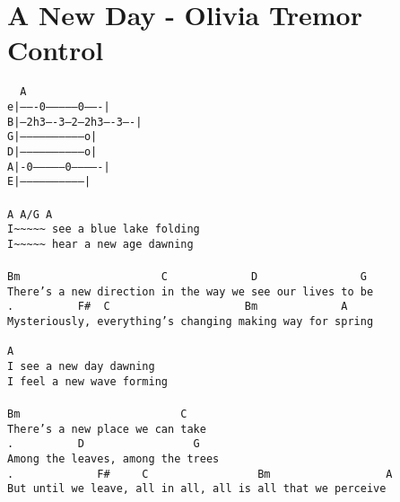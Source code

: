 \newpage
\section{A New Day - Olivia Tremor Control}
\label{A New Day - Olivia Tremor Control}
\texttt{\ \ A\\
e|-------0--------------0-------|\\
B|---2h3----3---2---2h3----3----|\\
G|-----------------------------o|\\
D|-----------------------------o|\\
A|-0--------------0-------------|\\
E|------------------------------|\\
\\
A\ A/G\ A\\
I\textasciitilde\textasciitilde\textasciitilde\textasciitilde\textasciitilde\ see\ a\ blue\ lake\ folding\\
I\textasciitilde\textasciitilde\textasciitilde\textasciitilde\textasciitilde\ hear\ a\ new\ age\ dawning\\
\\
Bm\ \ \ \ \ \ \ \ \ \ \ \ \ \ \ \ \ \ \ \ \ \ C\ \ \ \ \ \ \ \ \ \ \ \ \ D\ \ \ \ \ \ \ \ \ \ \ \ \ \ \ \ G\\
There's\ a\ new\ direction\ in\ the\ way\ we\ see\ our\ lives\ to\ be\\
.\ \ \ \ \ \ \ \ \ \ F\#\ \ C\ \ \ \ \ \ \ \ \ \ \ \ \ \ \ \ \ \ \ \ \ Bm\ \ \ \ \ \ \ \ \ \ \ \ \ A\\
Mysteriously,\ everything's\ changing\ making\ way\ for\ spring\\
\ \ \ \\
A\\
I\ see\ a\ new\ day\ dawning\\
I\ feel\ a\ new\ wave\ forming\\
\\
Bm\ \ \ \ \ \ \ \ \ \ \ \ \ \ \ \ \ \ \ \ \ \ \ \ \ C\\
There's\ a\ new\ place\ we\ can\ take\\
.\ \ \ \ \ \ \ \ \ \ D\ \ \ \ \ \ \ \ \ \ \ \ \ \ \ \ \ G\\
Among\ the\ leaves,\ among\ the\ trees\\
.\ \ \ \ \ \ \ \ \ \ \ \ \ F\#\ \ \ \ \ C\ \ \ \ \ \ \ \ \ \ \ \ \ \ \ \ \ Bm\ \ \ \ \ \ \ \ \ \ \ \ \ \ \ \ \ \ A\\
But\ until\ we\ leave,\ all\ in\ all,\ all\ is\ all\ that\ we\ perceive}
